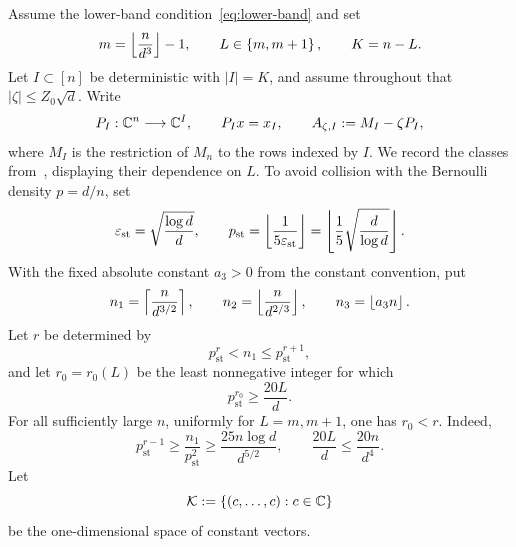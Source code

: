 Assume the lower-band condition~\eqref{eq:lower-band} and set
\begin{equation}\label{eq:kernel-codimension}
  m=\left\lfloor \frac n{d^3}\right\rfloor-1,
  \qquad
  L\in\left\{m,m+1\right\},
  \qquad
  K=n-L.
\end{equation}
Let $I\subset[n]$ be deterministic with $|I|=K$, and assume throughout that $|\zeta|\le Z_0\sqrt d$. Write
\[
  P_I:\mathbb C^n\longrightarrow\mathbb C^I,
  \qquad
  P_Ix=x_I,
  \qquad
  A_{\zeta,I}:=M_I-\zeta P_I,
\]
where $M_I$ is the restriction of $M_n$ to the rows indexed by $I$. We record the classes from~\cite[Section~4]{LLTTY19}, displaying their dependence on $L$. To avoid collision with the Bernoulli density $p=d/n$, set
\begin{equation}\label{eq:steep-epsilon-p}
  \varepsilon_{\mathrm{st}}=\sqrt{\frac{\log d}{d}},
  \qquad
  p_{\mathrm{st}}=\left\lfloor \frac1{5\varepsilon_{\mathrm{st}}}\right\rfloor
  =\left\lfloor \frac15\sqrt{\frac d{\log d}}\right\rfloor.
\end{equation}
With the fixed absolute constant $a_3>0$ from the constant convention, put
\begin{equation}\label{eq:n1n2n3}
  n_1=\left\lceil \frac n{d^{3/2}}\right\rceil,
  \qquad
  n_2=\left\lfloor \frac n{d^{2/3}}\right\rfloor,
  \qquad
  n_3=\left\lfloor a_3n\right\rfloor.
\end{equation}
Let $r$ be determined by
\begin{equation}\label{eq:r-steep}
  p_{\mathrm{st}}^r<n_1\le p_{\mathrm{st}}^{r+1},
\end{equation}
and let $r_0=r_0(L)$ be the least nonnegative integer for which
\begin{equation}\label{eq:r0-steep}
  p_{\mathrm{st}}^{r_0}\ge\frac{20L}{d}.
\end{equation}
For all sufficiently large $n$, uniformly for $L=m,m+1$, one has $r_0<r$. Indeed,
\[
  p_{\mathrm{st}}^{r-1}\ge\frac{n_1}{p_{\mathrm{st}}^2}
  \ge\frac{25n\log d}{d^{5/2}},
  \qquad
  \frac{20L}{d}\le\frac{20n}{d^4}.
\]
Let
\[
  \mathcal K:=\left\{(c,\ldots,c):c\in\mathbb C\right\}
\]
be the one-dimensional space of constant vectors.

